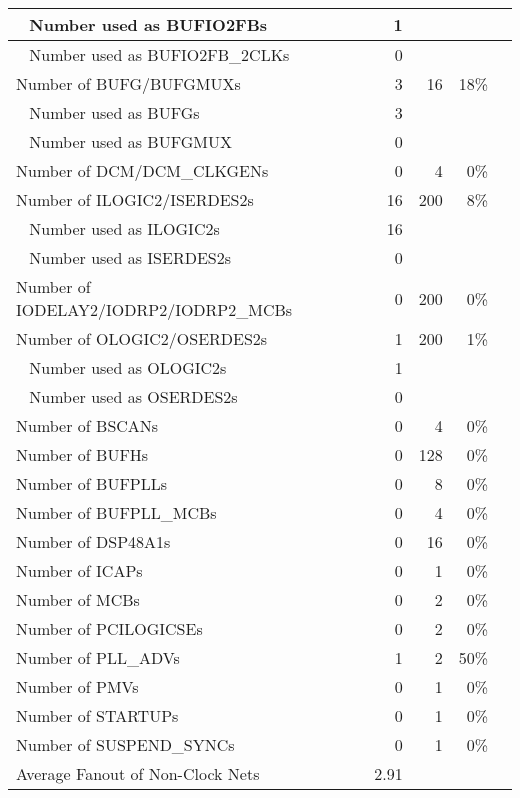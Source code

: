 {\begin{longtable}{|l|r|r|r|r|}
	\midrule
	\,\,\,\,\,Number used as BUFIO2FBs & 1     &       &       &  \\
	\midrule
	\,\,\,\,\,Number used as BUFIO2FB\_2CLKs & 0     &       &       &  \\
	\midrule
	Number of BUFG/BUFGMUXs & 3     & 16    & 18\%  &  \\
	\midrule
	\,\,\,\,\,Number used as BUFGs & 3     &       &       &  \\
	\midrule
	\,\,\,\,\,Number used as BUFGMUX & 0     &       &       &  \\
	\midrule
	Number of DCM/DCM\_CLKGENs & 0     & 4     & 0\%   &  \\
	\midrule
	Number of ILOGIC2/ISERDES2s & 16    & 200   & 8\%   &  \\
	\midrule
	\,\,\,\,\,Number used as ILOGIC2s & 16    &       &       &  \\
	\midrule
	\,\,\,\,\,Number used as ISERDES2s & 0     &       &       &  \\
	\midrule
	Number of IODELAY2/IODRP2/IODRP2\_MCBs & 0     & 200   & 0\%   &  \\
	\midrule
	Number of OLOGIC2/OSERDES2s & 1     & 200   & 1\%   &  \\
	\midrule
	\,\,\,\,\,Number used as OLOGIC2s & 1     &       &       &  \\
	\midrule
	\,\,\,\,\,Number used as OSERDES2s & 0     &       &       &  \\
	\midrule
	Number of BSCANs & 0     & 4     & 0\%   &  \\
	\midrule
	Number of BUFHs & 0     & 128   & 0\%   &  \\
	\midrule
	Number of BUFPLLs & 0     & 8     & 0\%   &  \\
	\midrule
	Number of BUFPLL\_MCBs & 0     & 4     & 0\%   &  \\
	\midrule
	Number of DSP48A1s & 0     & 16    & 0\%   &  \\
	\midrule
	Number of ICAPs & 0     & 1     & 0\%   &  \\
	\midrule
	Number of MCBs & 0     & 2     & 0\%   &  \\
	\midrule
	Number of PCILOGICSEs & 0     & 2     & 0\%   &  \\
	\midrule
	Number of PLL\_ADVs & 1     & 2     & 50\%  &  \\
	\midrule
	Number of PMVs & 0     & 1     & 0\%   &  \\
	\midrule
	Number of STARTUPs & 0     & 1     & 0\%   &  \\
	\midrule
	Number of SUSPEND\_SYNCs & 0     & 1     & 0\%   &  \\
	\midrule
	Average Fanout of Non-Clock Nets & 2.91  &       &       &  \\
\end{longtable}}


